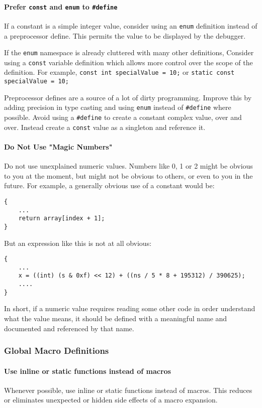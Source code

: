 \documentclass[fleqn,12pt]{PARCOneColumn} %
\begin{document}
\paragraph{Prefer {\tt\bf const} and {\tt\bf enum} to {\tt\bf\#define}}
If a constant is a simple integer value, consider using an {\tt enum} definition instead of a preprocessor define.
This permits the value to be displayed by the debugger.

If the {\tt enum} namespace is already cluttered with many other definitions,
Consider using a {\tt const} variable definition which allows more control over the scope of the definition. For example, {\tt const int specialValue = 10;} 
or {\tt static const specialValue = 10;}

Preprocessor defines are a source of a lot of dirty programming.
Improve this by adding precision in type casting and using {\tt enum}  instead of {\tt \#define} where possible.
Avoid using a {\tt \#define} to create a constant complex value, over and over.
Instead create a {\tt const} value as a singleton and reference it.

\paragraph{Do Not Use "Magic Numbers"}
Do not use unexplained numeric values.
Numbers like 0, 1 or 2 might be obvious to you at the moment, but might not be obvious to others, or even to you in the future.
For example, a generally obvious use of a constant would be:
\begin{lstlisting}
{
    ...
    return array[index + 1];
}
\end{lstlisting}

But an expression like this is not at all obvious:
\begin{lstlisting}[backgroundcolor=\color{badCodeColor}]
{
    ...
    x = ((int) (s & 0xf) << 12) + ((ns / 5 * 8 + 195312) / 390625);
    ....
}
\end{lstlisting}

In short, if a numeric value requires reading some other code in order
understand what the value means,
it should be defined with a meaningful name and 
documented and referenced by that name.

\subsubsection{Global Macro Definitions}

\paragraph{Use inline or static functions instead of macros}
Whenever possible, use inline or static functions instead of macros.
This reduces or eliminates unexpected or hidden side effects of a macro expansion.
\end{document}

